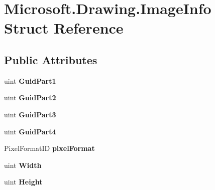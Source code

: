 \hypertarget{struct_microsoft_1_1_drawing_1_1_image_info}{
\section{Microsoft.Drawing.ImageInfo Struct Reference}
\label{struct_microsoft_1_1_drawing_1_1_image_info}
}
\subsection*{Public Attributes}
\begin{DoxyCompactItemize}
\item 
\hypertarget{struct_microsoft_1_1_drawing_1_1_image_info_a806e5d1309208024ffd0f7e3957f012e}{
uint {\bfseries GuidPart1}}
\label{struct_microsoft_1_1_drawing_1_1_image_info_a806e5d1309208024ffd0f7e3957f012e}

\item 
\hypertarget{struct_microsoft_1_1_drawing_1_1_image_info_a679c5ca185c25810cc70376d2fcec9bc}{
uint {\bfseries GuidPart2}}
\label{struct_microsoft_1_1_drawing_1_1_image_info_a679c5ca185c25810cc70376d2fcec9bc}

\item 
\hypertarget{struct_microsoft_1_1_drawing_1_1_image_info_af0cb66e5639df388617c85a0764bed3a}{
uint {\bfseries GuidPart3}}
\label{struct_microsoft_1_1_drawing_1_1_image_info_af0cb66e5639df388617c85a0764bed3a}

\item 
\hypertarget{struct_microsoft_1_1_drawing_1_1_image_info_aface6f0dfa02719d279bc8cc70d38182}{
uint {\bfseries GuidPart4}}
\label{struct_microsoft_1_1_drawing_1_1_image_info_aface6f0dfa02719d279bc8cc70d38182}

\item 
\hypertarget{struct_microsoft_1_1_drawing_1_1_image_info_a02d71f5d6180eeb91ec5a6a1bc0cecfa}{
PixelFormatID {\bfseries pixelFormat}}
\label{struct_microsoft_1_1_drawing_1_1_image_info_a02d71f5d6180eeb91ec5a6a1bc0cecfa}

\item 
\hypertarget{struct_microsoft_1_1_drawing_1_1_image_info_a0b195854f852f0bd2323130145fee292}{
uint {\bfseries Width}}
\label{struct_microsoft_1_1_drawing_1_1_image_info_a0b195854f852f0bd2323130145fee292}

\item 
\hypertarget{struct_microsoft_1_1_drawing_1_1_image_info_aff2754b9f0eefc0408538e9fb127763b}{
uint {\bfseries Height}}
\label{struct_microsoft_1_1_drawing_1_1_image_info_aff2754b9f0eefc0408538e9fb127763b}


\end{DoxyCompactItemize}
